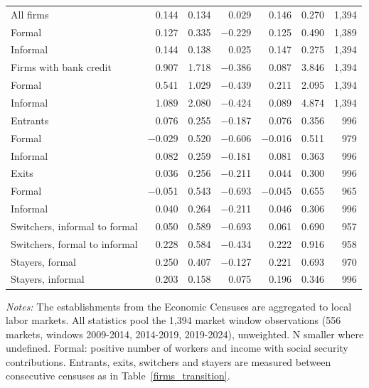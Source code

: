 \documentclass[12pt]{article}
\begin{document}
\begin{table}[H]
\begin{threeparttable}
\begin{tabular}{l r r r r r r}
            All firms & 0.144 & 0.134 & 0.029 & 0.146 & 0.270 & 1,394 \\
            \quad Formal & 0.127 & 0.335 & $-$0.229 & 0.125 & 0.490 & 1,389 \\
            \quad Informal & 0.144 & 0.138 & 0.025 & 0.147 & 0.275 & 1,394 \\
            Firms with bank credit & 0.907 & 1.718 & $-$0.386 & 0.087 & 3.846 & 1,394 \\
            \quad Formal & 0.541 & 1.029 & $-$0.439 & 0.211 & 2.095 & 1,394 \\
            \quad Informal & 1.089 & 2.080 & $-$0.424 & 0.089 & 4.874 & 1,394 \\
            Entrants & 0.076 & 0.255 & $-$0.187 & 0.076 & 0.356 & 996 \\
            \quad Formal & $-$0.029 & 0.520 & $-$0.606 & $-$0.016 & 0.511 & 979 \\
            \quad Informal & 0.082 & 0.259 & $-$0.181 & 0.081 & 0.363 & 996 \\
            Exits & 0.036 & 0.256 & $-$0.211 & 0.044 & 0.300 & 996 \\
            \quad Formal & $-$0.051 & 0.543 & $-$0.693 & $-$0.045 & 0.655 & 965 \\
            \quad Informal & 0.040 & 0.264 & $-$0.211 & 0.046 & 0.306 & 996 \\
            Switchers, informal to formal & 0.050 & 0.589 & $-$0.693 & 0.061 & 0.690 & 957 \\
            Switchers, formal to informal & 0.228 & 0.584 & $-$0.434 & 0.222 & 0.916 & 958 \\
            Stayers, formal & 0.250 & 0.407 & $-$0.127 & 0.221 & 0.693 & 970 \\
            Stayers, informal & 0.203 & 0.158 & 0.075 & 0.196 & 0.346 & 996 \\
            \bottomrule
        \end{tabular}
        \begin{tablenotes}[flushleft]
            \footnotesize
            \item \textit{Notes:} The establishments from the Economic Censuses are aggregated to local labor markets. All statistics pool the 1,394 market window observations (556 markets, windows 2009-2014, 2014-2019, 2019-2024), unweighted. N smaller where undefined. Formal: positive number of workers and income with social security contributions. Entrants, exits, switchers and stayers are measured between consecutive censuses as in Table~\ref{firms_transition}.
        \end{tablenotes}
    \end{threeparttable}
\end{table}
\end{document}
